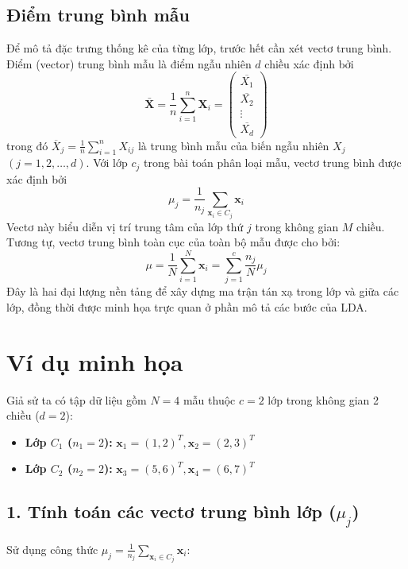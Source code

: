 \subsection{Điểm trung bình mẫu}
Để mô tả đặc trưng thống kê của từng lớp, trước hết cần xét vectơ trung bình. Điểm (vector) trung bình mẫu là điểm ngẫu nhiên $d$ chiều xác định bởi 
\[
\bar{\bm{X}} = \frac{1}{n} \sum_{i=1}^{n} \bm{X}_i = 
\begin{pmatrix}
\overline{X_1} \\
\overline{X_2} \\
\vdots \\
\overline{X_d}
\end{pmatrix}
\]
trong đó $\overline{X}_j = \frac{1}{n} \sum_{i=1}^n X_{ij}$ là trung bình mẫu của biến ngẫu nhiên $X_j$ $(j = 1, 2, \dots, d)$.
Với lớp $c_j$ trong bài toán phân loại mẫu, vectơ trung bình được xác định bởi
\[
\mu_j = \frac{1}{n_j} \sum_{\mathbf{x}_i \in C_j} \mathbf{x}_i
\]
Vectơ này biểu diễn vị trí trung tâm của lớp thứ $j$ trong không gian $M$ chiều. Tương tự, vectơ trung bình toàn cục của toàn bộ mẫu được cho bởi:
\[
\mu = \frac{1}{N} \sum_{i=1}^{N} \mathbf{x}_i = \sum_{j=1}^{c} \frac{n_j}{N} \mu_j
\]
Đây là hai đại lượng nền tảng để xây dựng ma trận tán xạ trong lớp và giữa các lớp, đồng thời được minh họa trực quan ở phần mô tả các bước của LDA.

\section*{Ví dụ minh họa}

Giả sử ta có tập dữ liệu gồm $N=4$ mẫu thuộc $c=2$ lớp trong không gian 2 chiều ($d=2$):

\begin{itemize}
    \item \textbf{Lớp $C_1$ ($n_1=2$):} $\bm{x}_1 = (1, 2)^T, \bm{x}_2 = (2, 3)^T$
    \item \textbf{Lớp $C_2$ ($n_2=2$):} $\bm{x}_3 = (5, 6)^T, \bm{x}_4 = (6, 7)^T$
\end{itemize}

\subsection*{1. Tính toán các vectơ trung bình lớp ($\mu_j$)}

Sử dụng công thức $\mu_j = \frac{1}{n_j} \sum_{\bm{x}_i \in C_j} \bm{x}_i$:

